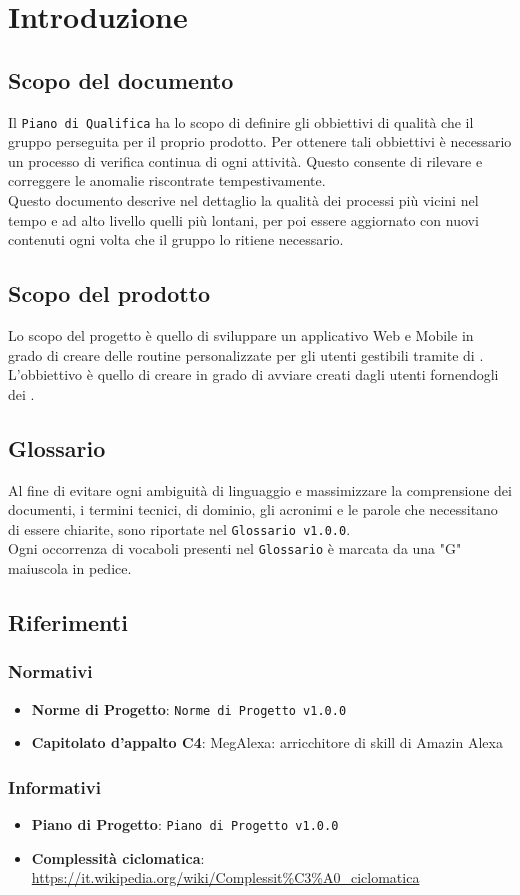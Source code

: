 \chapter{Introduzione}
\section{Scopo del documento}
Il \texttt{Piano di Qualifica} ha lo scopo di definire gli obbiettivi di qualità che il gruppo perseguita per il proprio prodotto. Per ottenere tali obbiettivi è necessario un processo di verifica continua di ogni attività. Questo consente di rilevare e correggere le anomalie riscontrate tempestivamente.\\
Questo documento descrive nel dettaglio la qualità dei processi più vicini nel tempo e ad alto livello quelli più lontani, per poi essere aggiornato con nuovi contenuti ogni volta che il gruppo lo ritiene necessario.
\section{Scopo del prodotto}
Lo scopo del progetto è quello di sviluppare un applicativo Web e Mobile in grado di creare delle routine personalizzate per gli utenti gestibili tramite  di . L'obbiettivo è quello di creare  in grado di avviare  creati dagli utenti fornendogli dei .
\section{Glossario}
Al fine di evitare ogni ambiguità di linguaggio e massimizzare la comprensione dei documenti, i termini tecnici, di dominio, gli acronimi e le parole che necessitano di essere chiarite, sono riportate nel \texttt{Glossario v1.0.0}.\\
Ogni occorrenza di vocaboli presenti nel \texttt{Glossario} è marcata da una "G" maiuscola in pedice.
\section{Riferimenti}
\subsection{Normativi}
\begin{itemize}
	\item  \textbf{Norme di Progetto}: \texttt{Norme di Progetto v1.0.0}
	\item \textbf{Capitolato d'appalto C4}: MegAlexa: arricchitore di skill di Amazin Alexa
\end{itemize}
\subsection{Informativi}
\begin{itemize}
	\item \textbf{Piano di Progetto}: \texttt{Piano di Progetto v1.0.0}
	\item \textbf{Complessità ciclomatica}: \url{https://it.wikipedia.org/wiki/Complessit\%C3\%A0_ciclomatica}
\end{itemize}
